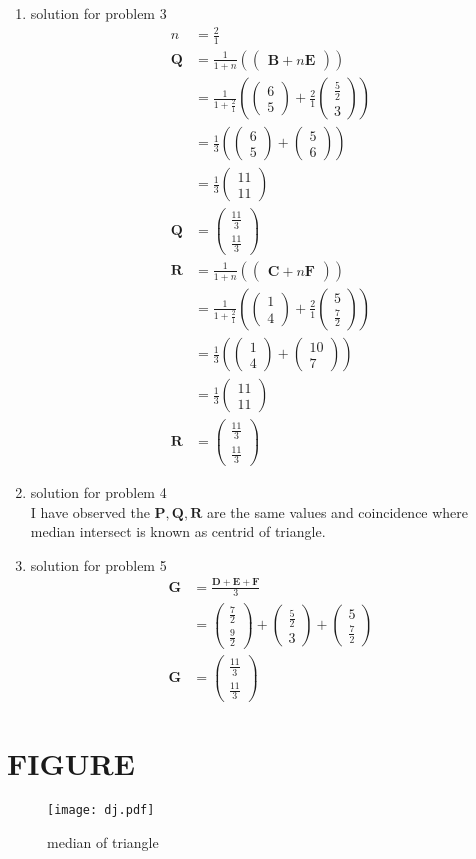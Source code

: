 \documentclass[12pt]{article}
\providecommand{\brak}[1]{\ensuremath{\left(#1\right)}}
\newcommand{\myvec}[1]{\ensuremath{\begin{pmatrix}#1\end{pmatrix}}}
\let\vec\mathbf
\begin{document}
\begin{enumerate}
\item solution for problem 3
\begin{align}
n&=\frac{2}{1}\\
\vec{Q}&=\frac{1}{1+n}\brak{\myvec{\vec{B}+n\vec{E}}}\\
&=\frac{1}{1+\frac{2}{1}}\brak{\myvec{6\\5}+\frac{2}{1}\myvec{\frac{5}{2}\\ 3}}\\
&=\frac{1}{3}\brak{\myvec{6\\5}+\myvec{5\\6}}\\
&=\frac{1}{3}\myvec{11\\11}\\
\vec{Q}&=\myvec{\frac{11}{3}\\[2pt] \frac{11}{3}}\\
\vec{R}&=\frac{1}{1+n}\brak{\myvec{\vec{C}+n\vec{F}}}\\
&=\frac{1}{1+\frac{2}{1}}\brak{\myvec{1\\4}+\frac{2}{1}\myvec{5\\ \frac{7}{2}}}\\
&=\frac{1}{3}\brak{\myvec{1\\4}+\myvec{10\\7}}\\
&=\frac{1}{3}\myvec{11\\11}\\
\vec{R}&=\myvec{\frac{11}{3}\\[2pt] \frac{11}{3}}
\end{align}

\item solution for problem 4
   \\I have observed the $\vec{P},\vec{Q},\vec{R}$ are the same values and coincidence where median intersect is known as centrid of triangle.
   
\item solution for problem 5
\begin{align}
\vec{G}&=\frac{\vec{D}+\vec{E}+\vec{F}}{3}\\
&=\myvec{\frac{7}{2}\\[2pt] \frac{9}{2}}+\myvec{\frac{5}{2}\\ 3}+\myvec{5\\ \frac{7}{2}}\\
\vec{G}&=\myvec{\frac{11}{3}\\[2pt] \frac{11}{3}}
\end{align} 
\end{enumerate}
\section{FIGURE}
\begin{figure}[h!]
\centering
\texttt{[image: dj.pdf]}
\caption{median of triangle}
  \label{fig:Figure}
\end{figure}
\end{document}
